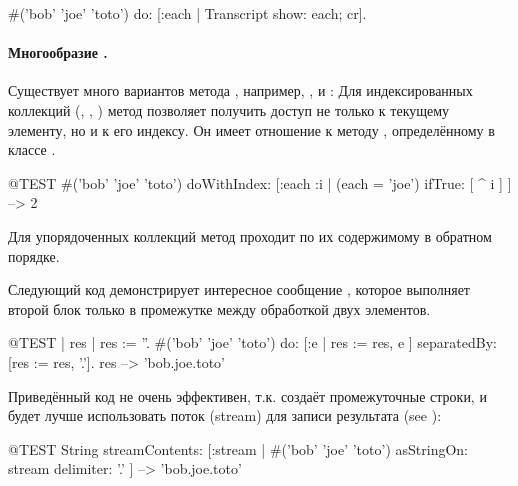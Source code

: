 \documentclass[a4paper,10pt,twoside]{book}
\begin{document}
\begin{code}{}
#('bob' 'joe' 'toto') do: [:each | Transcript show: each; cr].
\end{code}

\paragraph{Многообразие .} Существует много вариантов метода , например, \mbox{,} \mbox{} и :
Для индексированных коллекций (, , ) метод  позволяет получить доступ не только к текущему элементу, но и к его индексу. Он имеет отношение к методу , определённому в классе .

\begin{code}{@TEST}
#('bob' 'joe' 'toto') doWithIndex: [:each :i | (each = 'joe') ifTrue: [ ^ i ] ] --> 2
\end{code}

Для упорядоченных коллекций метод  проходит по их содержимому в обратном порядке.

Следующий код демонстрирует интересное сообщение , которое
выполняет второй блок только в промежутке между обработкой двух элементов.
\begin{code}{@TEST | res | }
res := ''.
#('bob' 'joe' 'toto') do: [:e | res := res, e ] separatedBy: [res := res, '.'].
res --> 'bob.joe.toto'
\end{code}
\noindent
Приведённый код не очень эффективен, т.к. создаёт промежуточные строки, и будет лучше использовать поток (stream) для записи результата (see ):
\begin{code}{@TEST}
String streamContents: [:stream | #('bob' 'joe' 'toto') asStringOn: stream delimiter: '.' ] --> 'bob.joe.toto'
\end{code}
\end{document}
